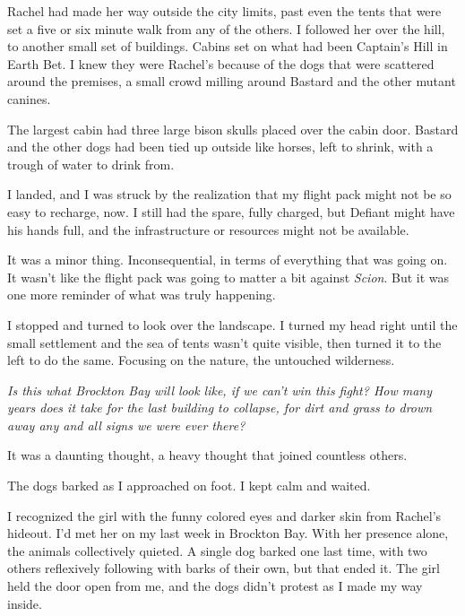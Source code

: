 Rachel had made her way outside the city limits, past even the tents that were set a five or six minute walk from any of the others.  I followed her over the hill, to another small set of buildings.  Cabins set on what had been Captain's Hill in Earth Bet.  I knew they were Rachel's because of the dogs that were scattered around the premises, a small crowd milling around Bastard and the other mutant canines.



The largest cabin had three large bison skulls placed over the cabin door.  Bastard and the other dogs had been tied up outside like horses, left to shrink, with a trough of water to drink from.



I landed, and I was struck by the realization that my flight pack might not be so easy to recharge, now.  I still had the spare, fully charged, but Defiant might have his hands full, and the infrastructure or resources might not be available.



It was a minor thing.  Inconsequential, in terms of everything that was going on.  It wasn't like the flight pack was going to matter a bit against \emph{Scion}.  But it was one more reminder of what was truly happening.



I stopped and turned to look over the landscape.  I turned my head right until the small settlement and the sea of tents wasn't quite visible, then turned it to the left to do the same.  Focusing on the nature, the untouched wilderness.



\emph{Is this what Brockton Bay will look like, if we can't win this fight?  How many years does it take for the last building to collapse, for dirt and grass to drown away any and all signs we were ever there?}



It was a daunting thought, a heavy thought that joined countless others.



The dogs barked as I approached on foot.  I kept calm and waited.



I recognized the girl with the funny colored eyes and darker skin from Rachel's hideout.  I'd met her on my last week in Brockton Bay.  With her presence alone, the animals collectively quieted.  A single dog barked one last time, with two others reflexively following with barks of their own, but that ended it.  The girl held the door open from me, and the dogs didn't protest as I made my way inside.



